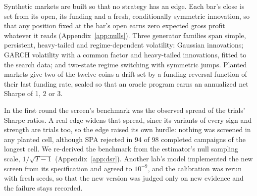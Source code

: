 \documentclass[11pt]{article}
\begin{document}
Synthetic markets are built so that no strategy has an edge. Each bar's close is set from its open, its funding and a fresh, conditionally symmetric innovation, so that any position fixed at the bar's open earns zero expected gross profit whatever it reads (Appendix~\ref{app:nulls}). Three generator families span simple, persistent, heavy-tailed and regime-dependent volatility: Gaussian innovations; GARCH volatility with a common factor and heavy-tailed innovations, fitted to the search data; and two-state regime switching with symmetric jumps. Planted markets give two of the twelve coins a drift set by a funding-reversal function of their last funding rate, scaled so that an oracle program earns an annualized net Sharpe of 1, 2 or 3.

In the first round the screen's benchmark was the observed spread of the trials' Sharpe ratios. A real edge widens that spread, since its variants of every sign and strength are trials too, so the edge raised its own hurdle: nothing was screened in any planted cell, although SPA rejected in 94 of 98 completed campaigns of the longest cell. We re-derived the benchmark from the estimator's null sampling scale, $1/\sqrt{T-1}$ (Appendix~\ref{app:dsr}). Another lab's model implemented the new screen from its specification and agreed to $10^{-9}$, and the calibration was rerun with fresh seeds, so that the new version was judged only on new evidence and the failure stays recorded.
\end{document}
